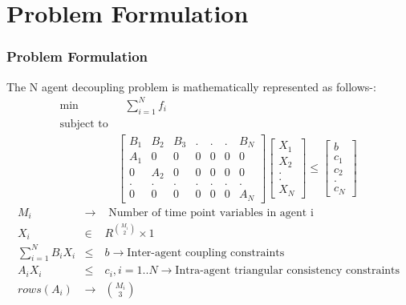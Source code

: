 \documentclass{beamer}
\newcommand\FontviTen{\fontsize{10}{7.2}\selectfont}
\begin{document}
\section{Problem Formulation}
\begin{frame}
\frametitle{Problem Formulation}
\FontviTen
The N agent decoupling problem is mathematically represented as follows-:
\begin{align*}
\text{$\mathrm{min}$ } & \text{  $\sum_{i=1}^{N} f_i$} \\
\text{subject to} & \\
&\begin{bmatrix}
B_{1} & B_{2} & B_{3} & . & . & . & B_{N}  \\
A_{1} &  0      &  0  & 0 & 0 & 0 &  0     \\
0     &  A_{2}  &  0  & 0 & 0 & 0 &  0     \\
.     &  .  &  .  & . &. & . &  .     \\
0     &  0      &  0  & 0 & 0 & 0 &  A_{N}  
\end{bmatrix}
\begin{bmatrix}
X_1 \\ X_2 \\ . \\ . \\ X_{N}
\end{bmatrix}
\leq
\begin{bmatrix}
b \\ c_1 \\ c_2 \\ . \\ c_N
\end{bmatrix}
\end{align*}
\begin{eqnarray}
M_i &\rightarrow& \text{ Number of time point variables in agent i } \nonumber\\
X_i &\in& R^{M_i \choose 2} \times 1 \nonumber \\
\sum_{i=1}^{N} B_i X_i &\leq& b \rightarrow \text{Inter-agent coupling constraints} \nonumber\\
A_i X_i &\leq& c_i , i = 1..N \rightarrow \text{Intra-agent triangular consistency constraints} \nonumber \\ 
rows(A_i)&\rightarrow& {M_i \choose 3} \nonumber
\end{eqnarray}
\end{frame}
\end{document}
